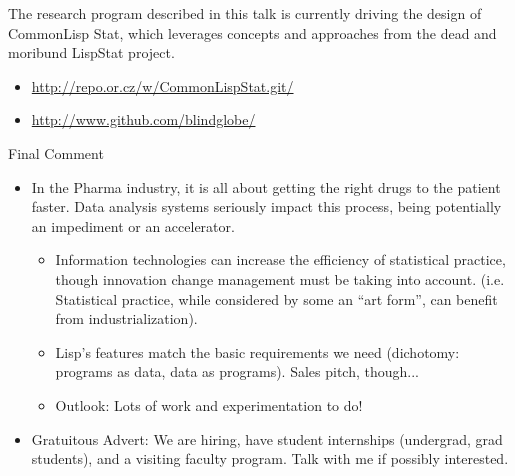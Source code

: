 \documentclass{beamer}
\begin{document}
\begin{frame}
  The research program described in this talk is currently driving the
  design of CommonLisp Stat, which leverages concepts and approaches
  from the dead and moribund LispStat project.

  \begin{itemize}
  \item \url{http://repo.or.cz/w/CommonLispStat.git/}
  \item \url{http://www.github.com/blindglobe/}
  \end{itemize}

\end{frame}
\begin{frame}{Final Comment}

  \begin{itemize}
  \item In the Pharma industry, it is all about getting the right
    drugs to the patient faster.  Data analysis systems seriously
    impact this process, being potentially an impediment or an
    accelerator.

    \begin{itemize}
    \item \alert{Information technologies can increase the efficiency
        of statistical practice}, though innovation change management
      must be taking into account.  (i.e. Statistical practice, while
      considered by some an ``art form'', can benefit from
      industrialization).
    \item \alert{Lisp's features match the basic requirements we need}
      (dichotomy: programs as data, data as programs).  Sales pitch,
      though...
    \item Outlook: Lots of work and experimentation to do!
    \end{itemize}
  \item {\tiny Gratuitous Advert: We are hiring, have student
      internships (undergrad, grad students), and a visiting faculty
      program.  Talk with me if possibly interested.}
  \end{itemize}
\end{frame}




\end{document}
